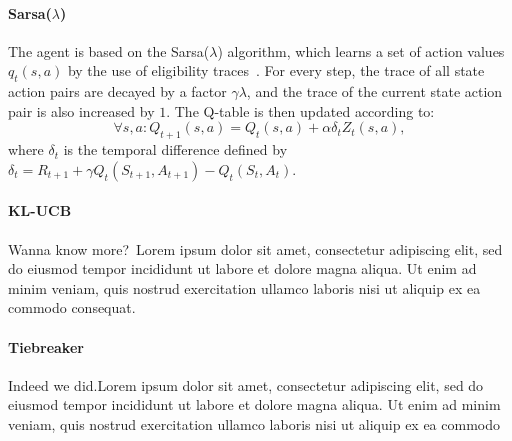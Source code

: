 
\paragraph{Sarsa($\lambda$)}
The agent is based on the Sarsa($\lambda$) algorithm, which learns a set of
action values $q_t(s,a)$ by the use of eligibility
traces~\cite{Sutton:1998:IRL:551283}. For every step, the trace of all state
action pairs are decayed by a factor $\gamma\lambda$, and the trace of the
current state action pair is also increased by $1$. The Q-table is then updated
according to:
\begin{equation}
        \forall s,a : Q_{t+1}(s,a) = Q_t(s,a) + \alpha\delta_t Z_t(s,a),
\end{equation}
where $\delta_t$ is the temporal difference defined by $\delta_t = R_{t+1} +
\gamma Q_t(S_{t+1},A_{t+1}) - Q_t(S_t,A_t)$.


\paragraph{KL-UCB}
Wanna know more?~\cite{DBLP:journals/jmlr/GarivierC11}Lorem ipsum dolor sit
amet, consectetur adipiscing elit, sed do eiusmod tempor incididunt ut labore et
dolore magna aliqua. Ut enim ad minim veniam, quis nostrud exercitation ullamco
laboris nisi ut aliquip ex ea commodo consequat. 

\paragraph{Tiebreaker}
Indeed we did.Lorem ipsum dolor sit amet, consectetur adipiscing elit, sed do
eiusmod tempor incididunt ut labore et dolore magna aliqua. Ut enim ad minim
veniam, quis nostrud exercitation ullamco laboris nisi ut aliquip ex ea commodo

